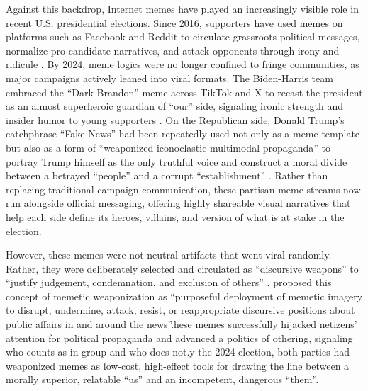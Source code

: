 \documentclass[12pt,twoside]{article}
\begin{document}
Against this backdrop, Internet memes have played an increasingly visible role in recent U.S. presidential elections. Since 2016, supporters have used memes on platforms such as Facebook and Reddit to circulate grassroots political messages, normalize pro-candidate narratives, and attack opponents through irony and ridicule \parencite{hunting2020popularmediamemes, moodyramirez2019facebookmemegroups}. By 2024, meme logics were no longer confined to fringe communities, as major campaigns actively leaned into viral formats. The Biden-Harris team embraced the ``Dark Brandon'' meme across TikTok and X to recast the president as an almost superheroic guardian of ``our'' side, signaling ironic strength and insider humor to young supporters \parencite{robertson2024bidenmemelord,mielczarek2024darkbrandonenthymeme}. On the Republican side, Donald Trump's catchphrase ``Fake News'' had been repeatedly used not only as a meme template but also as a form of ``weaponized iconoclastic multimodal propaganda'' \parencite[303]{smith2019weaponizediconoclasm} to portray Trump himself as the only truthful voice and construct a moral divide between a betrayed ``people'' and a corrupt ``establishment'' \parencite{ross2018discursivedeflection,woodward2020fakenewsguide}. Rather than replacing traditional campaign communication, these partisan meme streams now run alongside official messaging, offering highly shareable visual narratives that help each side define its heroes, villains, and version of what is at stake in the election.

However, these memes were not neutral artifacts that went viral randomly. Rather, they were deliberately selected and circulated as ``discursive weapons'' to ``justify judgement, condemnation, and exclusion of others'' \parencite[495]{nissenbaum2017contestedculturalcapital}. \textcite[218--219]{peters2021weaponizingmemes} proposed this concept of memetic weaponization as ``purposeful deployment of memetic imagery to disrupt, undermine, attack, resist, or reappropriate discursive positions about public affairs in and around the news''.hese memes successfully hijacked netizens' attention for political propaganda \parencite{olsen2018weaponizedmemes} and advanced a politics of othering, signaling who counts as in-group and who does not.y the 2024 election, both parties had weaponized memes as low-cost, high-effect tools for drawing the line between a morally superior, relatable ``us'' and an incompetent, dangerous ``them''. 
\end{document}
